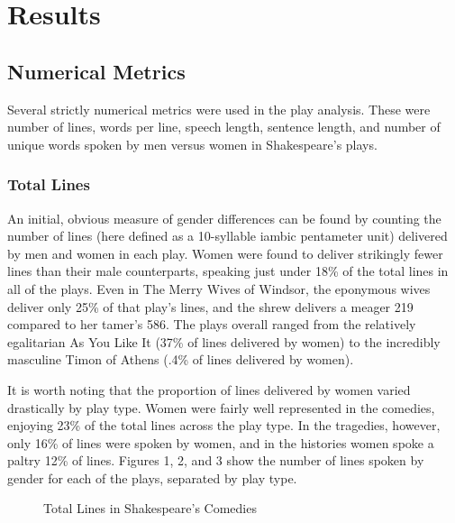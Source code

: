 \documentclass[12pt]{article} %
\begin{document}
	


\section{Results}

\subsection{Numerical Metrics}
Several strictly numerical metrics were used in the play analysis. These were number of lines, words per line, speech length, sentence length, and number of unique words spoken by men versus women in Shakespeare's plays.


\subsubsection{Total Lines}
An initial, obvious measure of gender differences can be found by counting the number of lines (here defined as a 10-syllable iambic pentameter unit) delivered by men and women in each play. Women were found to deliver strikingly fewer lines than their male counterparts, speaking just under 18\% of the total lines in all of the plays.  Even in The Merry Wives of Windsor, the eponymous wives deliver only 25\% of that play's lines, and the shrew delivers a meager 219 compared to her tamer's 586. The plays overall ranged from the relatively egalitarian As You Like It (37\% of lines delivered by women) to the incredibly masculine Timon of Athens (.4\% of lines delivered by women).

It is worth noting that the proportion of lines delivered by women varied drastically by play type. Women were fairly well represented in the comedies, enjoying 23\% of the total lines across the play type. In the tragedies, however, only 16\% of lines were spoken by women, and in the histories women spoke a paltry 12\% of lines. Figures 1, 2, and 3 show the number of lines spoken by gender for each of the plays, separated by play type.

\begin{figure}[H] %
\caption{Total Lines in Shakespeare's Comedies}
\label{fig:speciation}
\end{figure}
\end{document}
